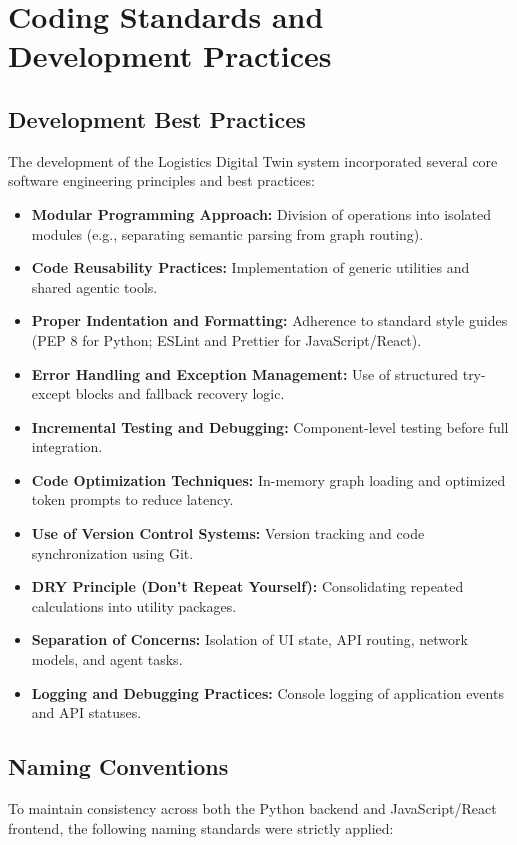\section[Coding Standards and Development Practices]{Coding Standards and Development Practices}

\subsection[Development Best Practices]{Development Best Practices}
The development of the Logistics Digital Twin system incorporated several core software engineering principles and best practices:

\begin{itemize}
    \item \textbf{Modular Programming Approach:} Division of operations into isolated modules (e.g., separating semantic parsing from graph routing).
    \item \textbf{Code Reusability Practices:} Implementation of generic utilities and shared agentic tools.
    \item \textbf{Proper Indentation and Formatting:} Adherence to standard style guides (PEP 8 for Python; ESLint and Prettier for JavaScript/React).
    \item \textbf{Error Handling and Exception Management:} Use of structured try-except blocks and fallback recovery logic.
    \item \textbf{Incremental Testing and Debugging:} Component-level testing before full integration.
    \item \textbf{Code Optimization Techniques:} In-memory graph loading and optimized token prompts to reduce latency.
    \item \textbf{Use of Version Control Systems:} Version tracking and code synchronization using Git.
    \item \textbf{DRY Principle (Don’t Repeat Yourself):} Consolidating repeated calculations into utility packages.
    \item \textbf{Separation of Concerns:} Isolation of UI state, API routing, network models, and agent tasks.
    \item \textbf{Logging and Debugging Practices:} Console logging of application events and API statuses.
\end{itemize}

\subsection[Naming Conventions]{Naming Conventions}
To maintain consistency across both the Python backend and JavaScript/React frontend, the following naming standards were strictly applied:

